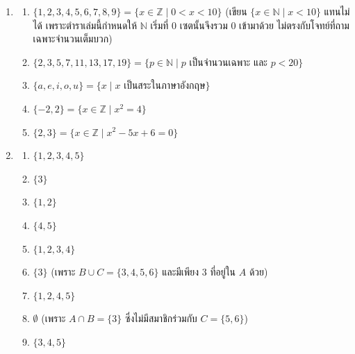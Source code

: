 \answerkeyhead
{}
\begin{enumerate}[series=anskey,label={},ref=\arabic*,leftmargin=0pt,itemsep=0.6em]
    \item
    \begin{enumerate}[label=\textbf{\thechapter.\arabic{enumi}.\arabic*}]
        \item $\{1, 2, 3, 4, 5, 6, 7, 8, 9\} = \{x \in \mathbb{Z} \mid 0 < x < 10\}$ (เขียน $\{x \in \mathbb{N} \mid x < 10\}$ แทนไม่ได้ เพราะตำราเล่มนี้กำหนดให้ $\mathbb{N}$ เริ่มที่ 0 เซตนั้นจึงรวม 0 เข้ามาด้วย ไม่ตรงกับโจทย์ที่ถามเฉพาะจำนวนเต็มบวก)
        \item $\{2, 3, 5, 7, 11, 13, 17, 19\} = \{p \in \mathbb{N} \mid p \text{ เป็นจำนวนเฉพาะ และ } p < 20\}$
        \item $\{a, e, i, o, u\} = \{x \mid x \text{ เป็นสระในภาษาอังกฤษ}\}$
        \item $\{-2, 2\} = \{x \in \mathbb{Z} \mid x^2 = 4\}$
        \item $\{2, 3\} = \{x \in \mathbb{Z} \mid x^2 - 5x + 6 = 0\}$
    \end{enumerate}

    \item
    \begin{enumerate}[label=\textbf{\thechapter.\arabic{enumi}.\arabic*}]
        \item $\{1, 2, 3, 4, 5\}$
        \item $\{3\}$
        \item $\{1, 2\}$
        \item $\{4, 5\}$
        \item $\{1, 2, 3, 4\}$
        \item $\{3\}$ (เพราะ $B \cup C = \{3,4,5,6\}$ และมีเพียง 3 ที่อยู่ใน $A$ ด้วย)
        \item $\{1, 2, 4, 5\}$
        \item $\emptyset$ (เพราะ $A \cap B = \{3\}$ ซึ่งไม่มีสมาชิกร่วมกับ $C = \{5,6\}$)
        \item $\{3, 4, 5\}$
    \end{enumerate}


\end{enumerate}
